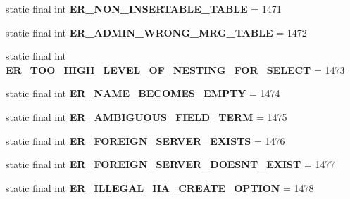 \begin{DoxyCompactItemize}
static final int {\bfseries E\+R\+\_\+\+N\+O\+N\+\_\+\+I\+N\+S\+E\+R\+T\+A\+B\+L\+E\+\_\+\+T\+A\+B\+LE} = 1471
\item 
\mbox{\label{classcom_1_1mysql_1_1jdbc_1_1_mysql_error_numbers_af292c30922cce85b8d77f09b700072f0}} 
static final int {\bfseries E\+R\+\_\+\+A\+D\+M\+I\+N\+\_\+\+W\+R\+O\+N\+G\+\_\+\+M\+R\+G\+\_\+\+T\+A\+B\+LE} = 1472
\item 
\mbox{\label{classcom_1_1mysql_1_1jdbc_1_1_mysql_error_numbers_a1860ac03bcce8a76df616d5023aecca9}} 
static final int {\bfseries E\+R\+\_\+\+T\+O\+O\+\_\+\+H\+I\+G\+H\+\_\+\+L\+E\+V\+E\+L\+\_\+\+O\+F\+\_\+\+N\+E\+S\+T\+I\+N\+G\+\_\+\+F\+O\+R\+\_\+\+S\+E\+L\+E\+CT} = 1473
\item 
\mbox{\label{classcom_1_1mysql_1_1jdbc_1_1_mysql_error_numbers_af3524a185d2cc930ddd3eb9f82b21639}} 
static final int {\bfseries E\+R\+\_\+\+N\+A\+M\+E\+\_\+\+B\+E\+C\+O\+M\+E\+S\+\_\+\+E\+M\+P\+TY} = 1474
\item 
\mbox{\label{classcom_1_1mysql_1_1jdbc_1_1_mysql_error_numbers_a32fd89daeed3e622790baf084e845275}} 
static final int {\bfseries E\+R\+\_\+\+A\+M\+B\+I\+G\+U\+O\+U\+S\+\_\+\+F\+I\+E\+L\+D\+\_\+\+T\+E\+RM} = 1475
\item 
\mbox{\label{classcom_1_1mysql_1_1jdbc_1_1_mysql_error_numbers_ad190cf866cd57e35e614eb56e4ef43e5}} 
static final int {\bfseries E\+R\+\_\+\+F\+O\+R\+E\+I\+G\+N\+\_\+\+S\+E\+R\+V\+E\+R\+\_\+\+E\+X\+I\+S\+TS} = 1476
\item 
\mbox{\label{classcom_1_1mysql_1_1jdbc_1_1_mysql_error_numbers_a127deddd09d18d06c6238b5f479d13aa}} 
static final int {\bfseries E\+R\+\_\+\+F\+O\+R\+E\+I\+G\+N\+\_\+\+S\+E\+R\+V\+E\+R\+\_\+\+D\+O\+E\+S\+N\+T\+\_\+\+E\+X\+I\+ST} = 1477
\item 
\mbox{\label{classcom_1_1mysql_1_1jdbc_1_1_mysql_error_numbers_a6e48faadfdc88cbff6bb9f2f6e239346}} 
static final int {\bfseries E\+R\+\_\+\+I\+L\+L\+E\+G\+A\+L\+\_\+\+H\+A\+\_\+\+C\+R\+E\+A\+T\+E\+\_\+\+O\+P\+T\+I\+ON} = 1478

\end{DoxyCompactItemize}
